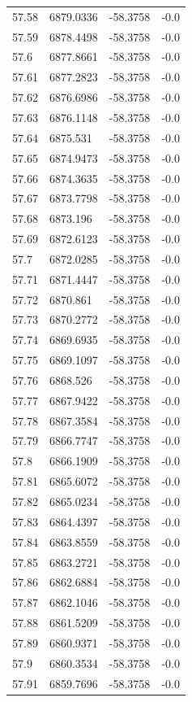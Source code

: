 \begin{table}[H]
\begin{tabular}{llll}
57.58 & 6879.0336 & -58.3758 & -0.0 \\
57.59 & 6878.4498 & -58.3758 & -0.0 \\
57.6 & 6877.8661 & -58.3758 & -0.0 \\
57.61 & 6877.2823 & -58.3758 & -0.0 \\
57.62 & 6876.6986 & -58.3758 & -0.0 \\
57.63 & 6876.1148 & -58.3758 & -0.0 \\
57.64 & 6875.531 & -58.3758 & -0.0 \\
57.65 & 6874.9473 & -58.3758 & -0.0 \\
57.66 & 6874.3635 & -58.3758 & -0.0 \\
57.67 & 6873.7798 & -58.3758 & -0.0 \\
57.68 & 6873.196 & -58.3758 & -0.0 \\
57.69 & 6872.6123 & -58.3758 & -0.0 \\
57.7 & 6872.0285 & -58.3758 & -0.0 \\
57.71 & 6871.4447 & -58.3758 & -0.0 \\
57.72 & 6870.861 & -58.3758 & -0.0 \\
57.73 & 6870.2772 & -58.3758 & -0.0 \\
57.74 & 6869.6935 & -58.3758 & -0.0 \\
57.75 & 6869.1097 & -58.3758 & -0.0 \\
57.76 & 6868.526 & -58.3758 & -0.0 \\
57.77 & 6867.9422 & -58.3758 & -0.0 \\
57.78 & 6867.3584 & -58.3758 & -0.0 \\
57.79 & 6866.7747 & -58.3758 & -0.0 \\
57.8 & 6866.1909 & -58.3758 & -0.0 \\
57.81 & 6865.6072 & -58.3758 & -0.0 \\
57.82 & 6865.0234 & -58.3758 & -0.0 \\
57.83 & 6864.4397 & -58.3758 & -0.0 \\
57.84 & 6863.8559 & -58.3758 & -0.0 \\
57.85 & 6863.2721 & -58.3758 & -0.0 \\
57.86 & 6862.6884 & -58.3758 & -0.0 \\
57.87 & 6862.1046 & -58.3758 & -0.0 \\
57.88 & 6861.5209 & -58.3758 & -0.0 \\
57.89 & 6860.9371 & -58.3758 & -0.0 \\
57.9 & 6860.3534 & -58.3758 & -0.0 \\
57.91 & 6859.7696 & -58.3758 & -0.0 \\

\end{tabular}
\end{table}
